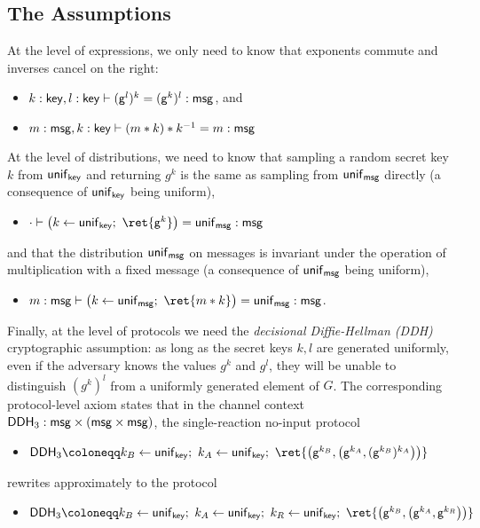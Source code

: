 \subsection{The Assumptions}
At the level of expressions, we only need to know that exponents commute and inverses cancel on the right:
\begin{itemize}
\item $k : \mathsf{key}, l : \mathsf{key} \vdash (\mathsf{g}^l)^k = (\mathsf{g}^k)^l : \mathsf{msg}$, and
\item $m : \mathsf{msg}, k : \mathsf{key} \vdash (m * k) * k^{-1} = m : \mathsf{msg}$
\end{itemize}
At the level of distributions, we need to know that sampling a random secret key $k$ from $\mathsf{unif}_{\mathsf{key}}$ and returning $g^k$ is the same as sampling from $\mathsf{unif}_{\mathsf{msg}}$ directly (a consequence of $\mathsf{unif}_{\mathsf{key}}$ being uniform),
\begin{itemize}
\item $\cdot \vdash \big(k \leftarrow \unif_\key; \ \ret{\gen^k}\big) = \unif_\msg : \msg$
\end{itemize}
and that the distribution $\mathsf{unif}_{\mathsf{msg}}$ on messages is invariant under the operation of multiplication with a fixed message (a consequence of $\mathsf{unif}_{\mathsf{msg}}$ being uniform),
\begin{itemize}
\item $m : \msg \vdash \big(k \leftarrow \unif_\msg; \ \ret{m * k}\big) = \unif_\msg : \msg$.
\end{itemize}
Finally, at the level of protocols we need the \emph{decisional Diffie-Hellman (DDH)} cryptographic assumption: as long as the secret keys $k,l$ are generated uniformly, even if the adversary knows the values $g^k$ and $g^l$, they will be unable to distinguish $(g^k)^l$ from a uniformly generated element of $G$. The corresponding protocol-level axiom states that in the channel context $\mathsf{DDH}_3 : \mathsf{msg} \times (\mathsf{msg} \times \mathsf{msg})$, the single-reaction no-input protocol
\begin{itemize}
\item $\DDH_3 \coloneqq k_B \leftarrow \unif_\key; \ k_A \leftarrow \unif_\key; \ \ret{\big(\gen^{k_B}, \big(\gen^{k_A}, (\gen^{k_B})^{k_A}\big)\big)}$
\end{itemize}
rewrites approximately to the protocol
\begin{itemize}
\item $\DDH_3 \coloneqq k_B \leftarrow \unif_\key; \ k_A \leftarrow \unif_\key; \ k_R \leftarrow \unif_\key; \ \ret{\big(\gen^{k_B}, \big(\gen^{k_A}, \gen^{k_R}\big)\big)}$
\end{itemize}

